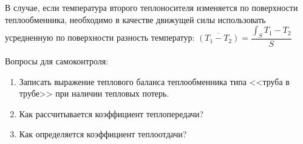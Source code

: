 В случае, если температура второго теплоносителя изменяется по поверхности теплообменника, необходимо в качестве движущей силы использовать усредненную по поверхности разность температур: $\overline{(T_1-T_2)}=\dfrac{\int_{S} T_1 -T_2}{S}$

Вопросы для самоконтроля:
\begin{enumerate}
	\item Записать выражение теплового баланса теплообменника типа <<труба в трубе>> при наличии тепловых потерь.
	\item Как рассчитывается коэффициент теплопередачи?
	\item Как определяется коэффициент теплоотдачи?
\end{enumerate}


